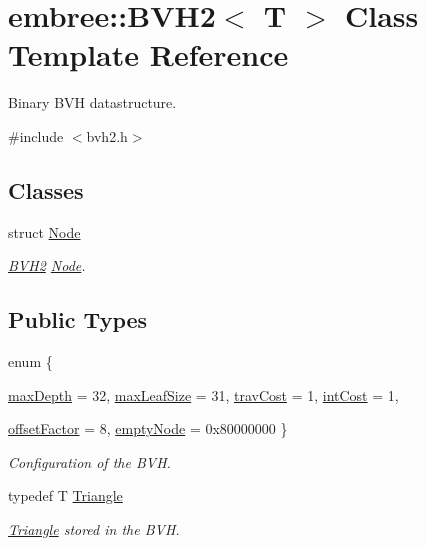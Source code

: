 \hypertarget{classembree_1_1_b_v_h2}{
\section{embree::BVH2$<$ T $>$ Class Template Reference}
\label{classembree_1_1_b_v_h2}
}


Binary BVH datastructure.  




{\ttfamily \#include $<$bvh2.h$>$}

\subsection*{Classes}
\begin{DoxyCompactItemize}
\item 
struct \hyperlink{structembree_1_1_b_v_h2_1_1_node}{Node}
\begin{DoxyCompactList}\small\item\em \hyperlink{classembree_1_1_b_v_h2}{BVH2} \hyperlink{structembree_1_1_b_v_h2_1_1_node}{Node}. \item\end{DoxyCompactList}\end{DoxyCompactItemize}
\subsection*{Public Types}
\begin{DoxyCompactItemize}
\item 
enum \{ \par
\hyperlink{classembree_1_1_b_v_h2_ad1f3bff28460ef5747a251ae58e103f6a9b4c00a0b7f9b78ec7c4d2b7acaf816f}{maxDepth} =  32, 
\hyperlink{classembree_1_1_b_v_h2_ad1f3bff28460ef5747a251ae58e103f6a6d2e0b25a024c0f794bec3c21ee715a9}{maxLeafSize} =  31, 
\hyperlink{classembree_1_1_b_v_h2_ad1f3bff28460ef5747a251ae58e103f6abc7a468da73de47cb3e79d527bb72381}{travCost} =  1, 
\hyperlink{classembree_1_1_b_v_h2_ad1f3bff28460ef5747a251ae58e103f6a75e3d2bc1e72635cb805bf1822b68630}{intCost} =  1, 
\par
\hyperlink{classembree_1_1_b_v_h2_ad1f3bff28460ef5747a251ae58e103f6acd8990411f1dd72ce03c80cd8e55aeb9}{offsetFactor} =  8, 
\hyperlink{classembree_1_1_b_v_h2_ad1f3bff28460ef5747a251ae58e103f6a0f23000cbf046f49a77214c37fc09713}{emptyNode} =  0x80000000
 \}
\begin{DoxyCompactList}\small\item\em Configuration of the BVH. \item\end{DoxyCompactList}\item 
typedef T \hyperlink{classembree_1_1_b_v_h2_af8815fd128a203409a0fe00c103c2710}{Triangle}
\begin{DoxyCompactList}\small\item\em \hyperlink{classembree_1_1_triangle}{Triangle} stored in the BVH. \item\end{DoxyCompactList}\end{DoxyCompactItemize}
